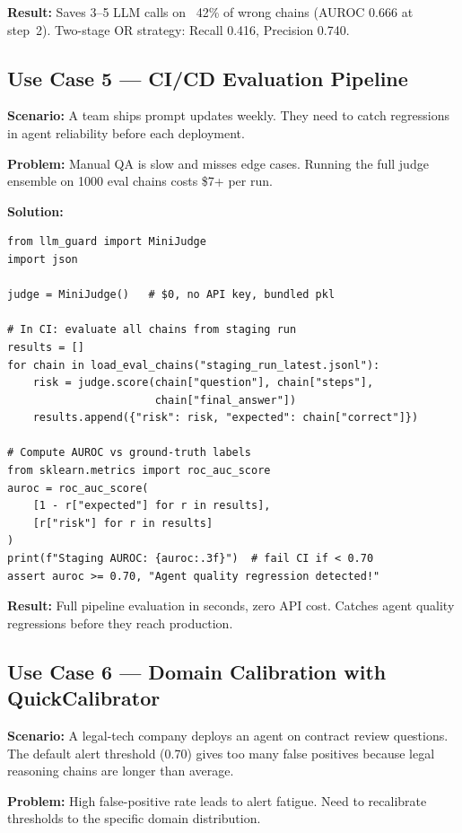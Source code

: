 \documentclass[11pt,a4paper]{article}
\begin{document}
\textbf{Result:} Saves 3--5 LLM calls on ~42\% of wrong chains
(AUROC 0.666 at step~2). Two-stage OR strategy: Recall 0.416, Precision 0.740.

\subsection{Use Case 5 --- CI/CD Evaluation Pipeline}

\textbf{Scenario:} A team ships prompt updates weekly. They need to catch
regressions in agent reliability before each deployment.

\textbf{Problem:} Manual QA is slow and misses edge cases. Running the
full judge ensemble on 1000 eval chains costs \$7+ per run.

\textbf{Solution:}

\begin{lstlisting}
from llm_guard import MiniJudge
import json

judge = MiniJudge()   # $0, no API key, bundled pkl

# In CI: evaluate all chains from staging run
results = []
for chain in load_eval_chains("staging_run_latest.jsonl"):
    risk = judge.score(chain["question"], chain["steps"],
                       chain["final_answer"])
    results.append({"risk": risk, "expected": chain["correct"]})

# Compute AUROC vs ground-truth labels
from sklearn.metrics import roc_auc_score
auroc = roc_auc_score(
    [1 - r["expected"] for r in results],
    [r["risk"] for r in results]
)
print(f"Staging AUROC: {auroc:.3f}")  # fail CI if < 0.70
assert auroc >= 0.70, "Agent quality regression detected!"
\end{lstlisting}

\textbf{Result:} Full pipeline evaluation in seconds, zero API cost.
Catches agent quality regressions before they reach production.

\subsection{Use Case 6 --- Domain Calibration with QuickCalibrator}

\textbf{Scenario:} A legal-tech company deploys an agent on contract review
questions. The default alert threshold (0.70) gives too many false positives
because legal reasoning chains are longer than average.

\textbf{Problem:} High false-positive rate leads to alert fatigue.
Need to recalibrate thresholds to the specific domain distribution.
\end{document}
